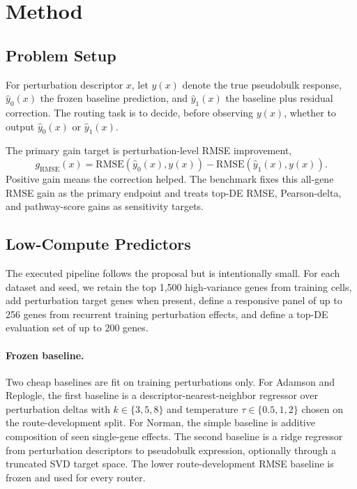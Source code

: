 \documentclass{article}
\newcommand{\yb}{\hat{y}_0}
\newcommand{\yc}{\hat{y}_1}
\newcommand{\gain}{g_{\mathrm{RMSE}}}
\begin{document}
\section{Method}
\label{sec:method}
\subsection{Problem Setup}
For perturbation descriptor $x$, let $y(x)$ denote the true pseudobulk response, $\yb(x)$ the frozen baseline prediction, and $\yc(x)$ the baseline plus residual correction. The routing task is to decide, before observing $y(x)$, whether to output $\yb(x)$ or $\yc(x)$.

The primary gain target is perturbation-level RMSE improvement,
\begin{equation}
\gain(x) = \mathrm{RMSE}(\yb(x), y(x)) - \mathrm{RMSE}(\yc(x), y(x)).
\end{equation}
Positive gain means the correction helped. The benchmark fixes this all-gene RMSE gain as the primary endpoint and treats top-DE RMSE, Pearson-delta, and pathway-score gains as sensitivity targets.

\subsection{Low-Compute Predictors}
The executed pipeline follows the proposal but is intentionally small. For each dataset and seed, we retain the top 1{,}500 high-variance genes from training cells, add perturbation target genes when present, define a responsive panel of up to 256 genes from recurrent training perturbation effects, and define a top-DE evaluation set of up to 200 genes.

\paragraph{Frozen baseline.}
Two cheap baselines are fit on training perturbations only. For Adamson and Replogle, the first baseline is a descriptor-nearest-neighbor regressor over perturbation deltas with $k \in \{3,5,8\}$ and temperature $\tau \in \{0.5,1,2\}$ chosen on the route-development split. For Norman, the simple baseline is additive composition of seen single-gene effects. The second baseline is a ridge regressor from perturbation descriptors to pseudobulk expression, optionally through a truncated SVD target space. The lower route-development RMSE baseline is frozen and used for every router.
\end{document}
